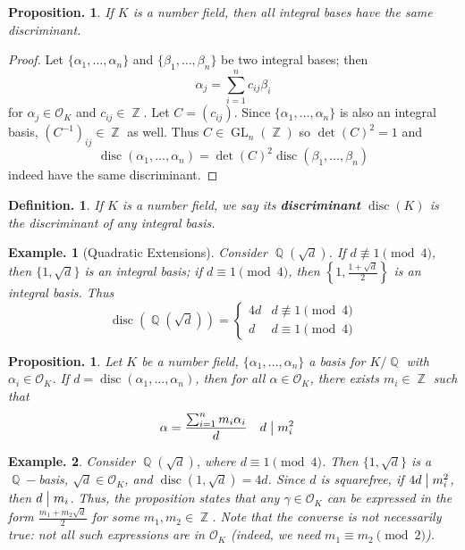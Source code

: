 \documentclass[11pt, a4paper]{memoir}
\DeclareMathOperator{\Q}{{\mathbb{Q}}}
\DeclareMathOperator{\Z}{{\mathbb{Z}}}
\renewcommand{\div}{\bigm|}
\theoremstyle{change}
\newtheorem{proposition}[theorem]{Proposition.}
\theoremstyle{plain}
\theoremstyle{nonumberplain}
\newtheorem{definition}{Definition.}
\newtheorem{example}{Example.}
\newtheorem{proof}{Proof}
\DeclareMathOperator{\disc}{disc}
\DeclareMathOperator{\GL}{GL}
\newcommand{\mbf}[1]{{\boldmath\bfseries #1}}
\numberwithin{equation}{section}
\begin{document}
\begin{proposition}
    If $K$ is a number field, then all integral bases have the same discriminant.
\end{proposition}
\begin{proof}
    Let $\{\alpha_1,\ldots,\alpha_n\}$ and $\{\beta_1,\ldots,\beta_n\}$ be two integral bases; then
    \begin{equation*}
        \alpha_j=\sum\limits_{i=1}^n c_{ij}\beta_i
    \end{equation*}
    for $\alpha_j\in\mathcal{O}_K$ and $c_{ij}\in\Z$.
    Let $C=(c_{ij})$.
    Since $\{\alpha_1,\ldots,\alpha_n\}$ is also an integral basis, $\left(C^{-1}\right)_{ij}\in\Z$ as well.
    Thus $C\in\GL_n(\Z)$ so $\det(C)^2=1$ and
    \begin{equation*}
        \disc(\alpha_1,\ldots,\alpha_n)=\det(C)^2\disc(\beta_1,\ldots,\beta_n)
    \end{equation*}
    indeed have the same discriminant.
\end{proof}
\begin{definition}
    If $K$ is a number field, we say its \mbf{discriminant} $\disc(K)$ is the discriminant of any integral basis.
\end{definition}
\begin{example}[Quadratic Extensions]
    Consider $\Q(\sqrt{d})$.
    If $d\nequiv 1\pmod{4}$, then $\{1,\sqrt{d}\}$ is an integral basis; if $d\equiv 1\pmod{4}$, then $\left\{1,\frac{1+\sqrt{d}}{2}\right\}$ is an integral basis.
    Thus
    \begin{equation*}
        \disc(\Q(\sqrt{d}))=
        \begin{cases}
            4d & d\nequiv 1\pmod{4}\\
            d & d\equiv 1\pmod{4}
        \end{cases}
    \end{equation*}
\end{example}
\begin{proposition}\label{p:ext}
    Let $K$ be a number field, $\{\alpha_1,\ldots,\alpha_n\}$ a basis for $K/\Q$ with $\alpha_i\in\mathcal{O}_K$.
    If $d=\disc(\alpha_1,\ldots,\alpha_n)$, then for all $\alpha\in\mathcal{O}_K$, there exists $m_i\in\Z$ such that
    \begin{align*}
        \alpha&=\frac{\sum_{i=1}^n m_i\alpha_i}{d} &  d&\div m_i^2
    \end{align*}
\end{proposition}
\begin{example}
    Consider $\Q(\sqrt{d})$, where $d\equiv 1\pmod{4}$.
    Then $\{1,\sqrt{d}\}$ is a $\Q-$basis, $\sqrt{d}\in\mathcal{O}_K$, and $\disc(1,\sqrt{d})=4d$.
    Since $d$ is squarefree, if $4d\div m_i^2$, then $d\div m_i$.
    Thus, the proposition states that any $\gamma\in\mathcal{O}_K$ can be expressed in the form $\frac{m_1+m_2\sqrt{d}}{2}$ for some $m_1,m_2\in\Z$.
    Note that the converse is not necessarily true: not all such expressions are in $\mathcal{O}_K$ (indeed, we need $m_1\equiv m_2\pmod{2}$).
\end{example}
\end{document}
